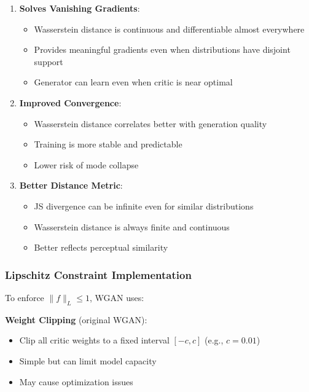 \documentclass[conference,12pt]{IEEEtran}
\begin{document}
\begin{enumerate}
    \item \textbf{Solves Vanishing Gradients}: 
    \begin{itemize}
        \item Wasserstein distance is continuous and differentiable almost everywhere
        \item Provides meaningful gradients even when distributions have disjoint support
        \item Generator can learn even when critic is near optimal
    \end{itemize}
    
    \item \textbf{Improved Convergence}:
    \begin{itemize}
        \item Wasserstein distance correlates better with generation quality
        \item Training is more stable and predictable
        \item Lower risk of mode collapse
    \end{itemize}
    
    \item \textbf{Better Distance Metric}:
    \begin{itemize}
        \item JS divergence can be infinite even for similar distributions
        \item Wasserstein distance is always finite and continuous
        \item Better reflects perceptual similarity
    \end{itemize}
\end{enumerate}

\subsubsection{Lipschitz Constraint Implementation}

To enforce $\|f\|_L \leq 1$, WGAN uses:

\textbf{Weight Clipping} (original WGAN):
\begin{itemize}
    \item Clip all critic weights to a fixed interval $[-c, c]$ (e.g., $c = 0.01$)
    \item Simple but can limit model capacity
    \item May cause optimization issues
\end{itemize}
\end{document}
